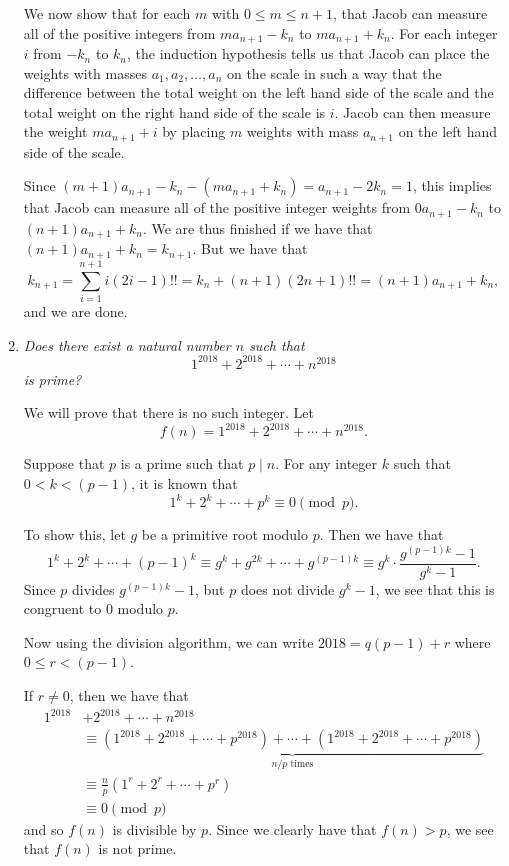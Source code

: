 \documentclass{article}
\begin{document}
\begin{enumerate}[1.]
We now show that for each $m$ with $0 \leq m \leq n + 1$, that Jacob can measure all of the positive integers from $m a_{n + 1} - k_n$ to $ma_{n + 1} + k_n$.  For each integer $i$ from $-k_n$ to $k_n$, the induction hypothesis tells us that Jacob can place the weights with masses $a_1, a_2, \dots, a_n$ on the scale in such a way that the difference between the total weight on the left hand side of the scale and the total weight on the right hand side of the scale is $i$. Jacob can then measure the weight $m a_{n + 1} + i$ by placing $m$ weights with mass $a_{n + 1}$ on the left hand side of the scale.

Since $(m + 1) a_{n + 1} - k_n - (m a_{n + 1} + k_n) = a_{n + 1} - 2k_n = 1$, this implies that Jacob can measure all of the positive integer weights from $0 a_{n + 1} - k_n$ to $(n + 1) a_{n + 1} + k_n$. We are thus finished if we have that $(n + 1) a_{n + 1} + k_n = k_{n + 1}$. But we have that
\[
  k_{n + 1} = \sum_{i = 1}^{n + 1} i (2i - 1)!! = k_n + (n + 1) (2n + 1)!! = (n + 1) a_{n + 1} + k_n,
\]
and we are done.


\vspace{6pt}
\item
\textit{Does there exist a natural number $n$ such that
\[
	1^{2018} + 2^{2018} + \cdots + n^{2018}
\]
is prime?}

We will prove that there is no such integer. Let
\[
	f(n) = 1^{2018} + 2^{2018} + \cdots + n^{2018}.
\]

Suppose that $p$ is a prime such that $p \mid n$. For any integer $k$ such that $0 < k < (p - 1)$, it is known that
\[
	1^k + 2^k + \cdots + p^k \equiv 0 \pmod p.
\]

To show this, let $g$ be a primitive root modulo $p$. Then we have that
\[
	1^k + 2^k + \cdots + {(p - 1)}^k \equiv g^k + g^{2k} + \cdots + g^{(p - 1)k} \equiv g^k \cdot \frac{g^{(p - 1)k} - 1}{g^k - 1}.
\]
Since $p$ divides $g^{(p - 1)k} - 1$, but $p$ does not divide $g^k - 1$, we see that this is congruent to $0$ modulo $p$.

Now using the division algorithm, we can write $2018 = q(p - 1) + r$ where $0 \leq r < (p - 1)$.

If $r \neq 0$, then we have that
\begin{align*}
	1^{2018} & + 2^{2018} + \cdots + n^{2018} \\
	& \equiv \underbrace{\left(1^{2018} + 2^{2018} + \cdots + p^{2018} \right) + \cdots + \left( 1^{2018} + 2^{2018} + \cdots + p^{2018} \right)}_{n/p \text{ times}} \\
	& \equiv \frac{n}{p} \left( 1^r + 2^r + \cdots + p^r \right) \\
	& \equiv 0 \pmod p
\end{align*}
and so $f(n)$ is divisible by $p$. Since we clearly have that $f(n) > p$, we see that $f(n)$ is not prime.


\end{enumerate}
\end{document}
